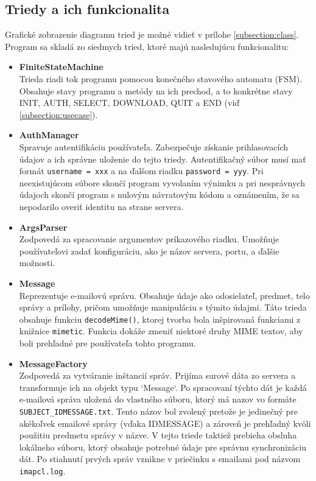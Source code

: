 \documentclass[a4paper, 11pt]{article}
\begin{document}
	\subsection{Triedy a ich funkcionalita}
	Grafické zobrazenie diagramu tried je možné vidieť v prílohe \ref{subsection:class}. Program sa skladá zo siedmych tried, ktoré majú nasledujúcu funkcionalitu:
	\begin{itemize}
		\item \textbf{FiniteStateMachine} \\
		Trieda riadi tok programu pomocou konečného stavového automatu (FSM). Obsahuje stavy programu a metódy na ich prechod, a to konkrétne stavy INIT, AUTH, SELECT, DOWNLOAD, QUIT a END (viď \ref{subsection:usecase}).
	
		\item \textbf{AuthManager} \\
		Spravuje autentifikáciu používateľa. Zabezpečuje získanie prihlasovacích údajov a ich správne uloženie do tejto triedy. Autentifikačný súbor musí mať formát \texttt{username =  xxx} a na ďalšom riadku \texttt{password =  yyy}. Pri neexistujúcom súbore skončí program vyvolaním výnimku a pri nesprávnych údajoch skončí program s nulovým návratovým kódom a oznámením, že sa nepodarilo overiť identitu na strane servera.
	
		\item \textbf{ArgsParser} \\
		Zodpovedá za spracovanie argumentov príkazového riadku. Umožňuje používateľovi zadať konfiguráciu, ako je názov servera, portu, a ďalšie možnosti.
	
		\item \textbf{Message} \\
		Reprezentuje e-mailovú správu. Obsahuje údaje ako odosielateľ, predmet, telo správy a prílohy, pričom umožňuje manipuláciu s týmito údajmi. Táto trieda obsahuje funkciu \texttt{decodeMime()}, ktorej tvorba bola inšpirovaná funkciami z knižnice \texttt{mimetic}. Funkcia dokáže zmeniť niektoré druhy MIME textov, aby boli prehľadné pre používateľa tohto programu.
	
		\item \textbf{MessageFactory} \\
		Zodpovedá za vytváranie inštancií správ. Prijíma surové dáta zo servera a transformuje ich na objekt typu `Message`. Po spracovaní týchto dát je každá e-mailová správa uložená do vlastného súboru, ktorý má nazov vo formáte \texttt{SUBJECT\_IDMESSAGE.txt}. Tento názov bol zvolený pretože je jedinečný pre akékoľvek emailové správy (vďaka IDMESSAGE) a zároveň je prehľadný kvôli použitiu predmetu správy v názve. V tejto triede taktiež prebieha obsluha lokálneho súboru, ktorý obsahuje potrebné údaje pre správnu synchronizáciu dát. Po stiahnutí prvých správ vznikne v priečinku s emailami pod názvom \texttt{imapcl.log}.
	

\end{itemize}
\end{document}

